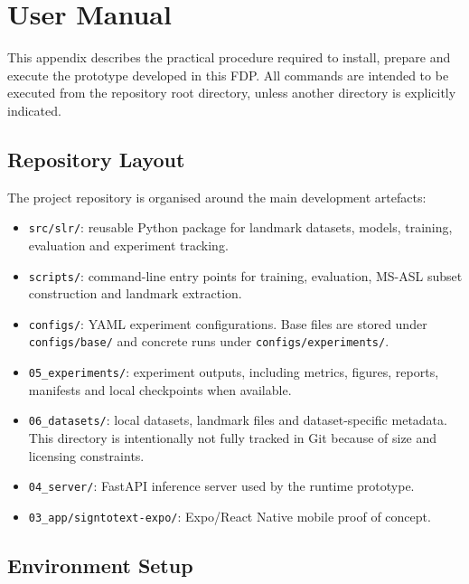 \clearpage

\chapter{User Manual}
\label{app:user_manual}

This appendix describes the practical procedure required to install, prepare and execute the
prototype developed in this FDP. All commands are intended to be executed from the repository root
directory, unless another directory is explicitly indicated.

\section{Repository Layout}
\label{app:user_manual_layout}

The project repository is organised around the main development artefacts:

\begin{itemize}
    \item \texttt{src/slr/}: reusable Python package for landmark datasets, models, training,
          evaluation and experiment tracking.
    \item \texttt{scripts/}: command-line entry points for training, evaluation, MS-ASL subset
          construction and landmark extraction.
    \item \texttt{configs/}: YAML experiment configurations. Base files are stored under
          \texttt{configs/base/} and concrete runs under \texttt{configs/experiments/}.
    \item \texttt{05\_experiments/}: experiment outputs, including metrics, figures, reports,
          manifests and local checkpoints when available.
    \item \texttt{06\_datasets/}: local datasets, landmark files and dataset-specific metadata.
          This directory is intentionally not fully tracked in Git because of size and licensing
          constraints.
    \item \texttt{04\_server/}: FastAPI inference server used by the runtime prototype.
    \item \texttt{03\_app/signtotext-expo/}: Expo/React Native mobile proof of concept.
\end{itemize}

\section{Environment Setup}
\label{app:user_manual_environment}

